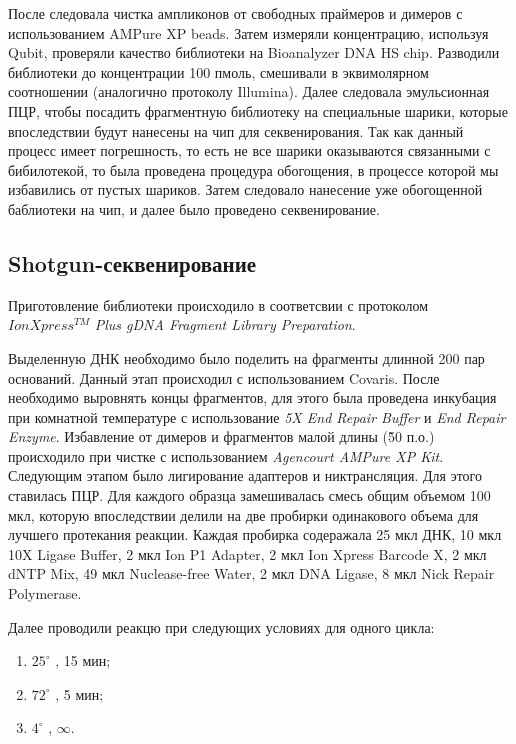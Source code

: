 После следовала чистка ампликонов от свободных праймеров и димеров с использованием AMPure XP beads. Затем измеряли концентрацию, используя Qubit, проверяли качество библиотеки на Bioanalyzer DNA HS chip. Разводили библиотеки до концентрации 100 пмоль, смешивали в эквимолярном соотношении (аналогично протоколу Illumina). Далее следовала эмульсионная ПЦР, чтобы посадить фрагментную библиотеку на специальные шарики, которые впоследствии будут нанесены на чип для секвенирования. Так как данный процесс имеет погрешность, то есть не все шарики оказываются связанными с бибилотекой, то была проведена процедура обогощения, в процессе которой мы избавились от пустых шариков. Затем следовало нанесение уже обогощенной баблиотеки на чип, и далее было проведено секвенирование.




\subsection{Shotgun-секвенирование}  \label{subsect1_2_4}
Приготовление библиотеки происходило в соответсвии с протоколом $IonXpress^{TM}$ \textit{Plus gDNA Fragment Library Preparation}.

Выделенную ДНК необходимо было поделить на фрагменты длинной 200 пар оснований. Данный этап происходил с использованием Covaris. После необходимо выровнять концы фрагментов, для этого была проведена инкубация при комнатной температуре с использование  \textit{5X End Repair Buffer} и  \textit{End Repair Enzyme}. Избавление от димеров и фрагментов малой длины (\~50 п.о.) происходило при чистке с использованием \textit{Agencourt AMPure XP Kit}. Следующим этапом было лигирование адаптеров и никтрансляция. Для этого ставилась ПЦР. Для каждого образца замешивалась смесь общим объемом 100 мкл, которую впоследствии делили на две пробирки одинакового объема для лучшего протекания реакции. Каждая пробирка содеражала 25 мкл ДНК, 10 мкл 10X Ligase Buffer, 2 мкл Ion P1 Adapter, 2 мкл Ion Xpress Barcode X, 2 мкл dNTP Mix, 49 мкл Nuclease-free Water, 2 мкл DNA Ligase, 8 мкл Nick Repair Polymerase. 

Далее проводили реакцю при следующих условиях для одного цикла:

\begin{enumerate}
	\item $25^{\circ}$ , 15 мин;
	\item $72^{\circ}$ , 5 мин;
	\item $4^{\circ}$ ,  $\infty$.
\end{enumerate}

